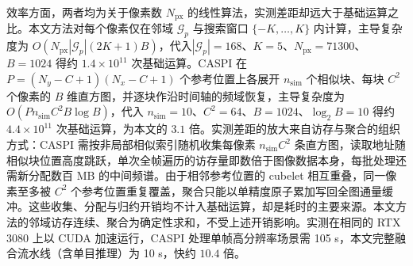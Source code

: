 效率方面，两者均为关于像素数 $N_{\mathrm{px}}$ 的线性算法，实测差距却远大于基础运算之比。本文方法对每个像素仅在邻域 $\mathcal{G}_p$ 与搜索窗口 $\{-K,\dots,K\}$ 内计算，主导复杂度为 $O(N_{\mathrm{px}}|\mathcal{G}_p|(2K+1)B)$，代入$|\mathcal{G}_p|=168$、$K=5$、$N_{\mathrm{px}}=71300$、$B=1024$ 得约 $1.4\times10^{11}$ 次基础运算。CASPI 在 $P=(N_y-C+1)(N_x-C+1)$ 个参考位置上各展开 $n_{\mathrm{sim}}$ 个相似块、每块 $C^2$ 个像素的 $B$ 维直方图，并逐块作沿时间轴的频域恢复，主导复杂度为 $O(Pn_{\mathrm{sim}}C^2B\log B)$，代入 $n_{\mathrm{sim}}=10$、$C^2=64$、$B=1024$、$\log_2B=10$ 得约 $4.4\times10^{11}$ 次基础运算，为本文的 $3.1$ 倍。实测差距的放大来自访存与聚合的组织方式：CASPI 需按非局部相似索引随机收集每像素 $n_{\mathrm{sim}}C^2$ 条直方图，读取地址随相似块位置高度跳跃，单次全帧遍历的访存量即数倍于图像数据本身，每批处理还需新分配数百 MB 的中间频谱。由于相邻参考位置的 cubelet 相互重叠，同一像素至多被 $C^2$ 个参考位置重复覆盖，聚合只能以单精度原子累加写回全图通量缓冲。这些收集、分配与归约开销均不计入基础运算，却是耗时的主要来源。本文方法的邻域访存连续、聚合为确定性求和，不受上述开销影响。实测在相同的 RTX 3080 上以 CUDA 加速运行，CASPI 处理单帧高分辨率场景需 105 s，本文完整融合流水线（含单目推理）为 10 s，快约 $10.4$ 倍。

